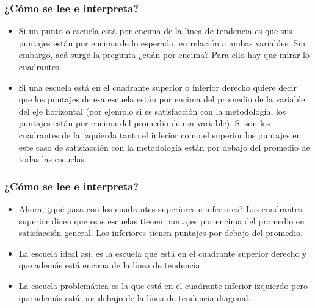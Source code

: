 \documentclass{beamer}
\begin{document}
\begin{frame}
\frametitle{¿Cómo se lee e interpreta?}


\begin{itemize}
\item Si un punto o escuela está por encima de la línea de tendencia es que sus puntajes están por encima de lo esperado, en relación a ambas variables. Sin embargo, acá surge la pregunta ¿cuán por encima? Para ello hay que mirar lo cuadrantes.
\item Si una escuela está en el cuadrante superior o inferior derecho quiere decir que los puntajes de esa escuela están por encima del promedio de la variable del eje horizontal (por ejemplo si es satisfacción con la metodología, los puntajes están por encima del promedio de esa variable). Si son los cuadrantes de la izquierda tanto el inferior como el superior los puntajes en este caso de satisfacción con la metodología están por debajo del promedio de todas las escuelas. 

\end{itemize}
\end{frame}

\begin{frame}
\frametitle{¿Cómo se lee e interpreta?}
\begin{itemize}
\item Ahora, ¿qué pasa con los cuadrantes superiores e inferiores? Los cuadrantes superior dicen que esas escuelas tienen puntajes por encima del promedio en satisfacción general. Los inferiores tienen puntajes por debajo del promedio.
\item La escuela ideal así, es la escuela que está en el cuadrante superior derecho y que además está encima de la línea de tendencia. 
\item La escuela problemática es la que está en el cuadrante inferior izquierdo pero que además está por debajo de la línea de tendencia diagonal. 

\end{itemize}

\end{frame}
\end{document}
